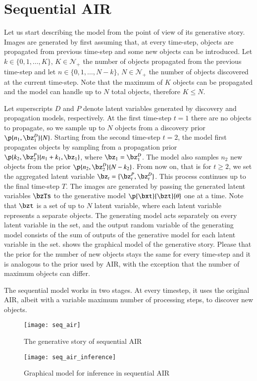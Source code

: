 \section{Sequential AIR}

Let us start describing the model from the point of view of its generative story. Images are generated by first assuming that, at every time-step, objects are propagated from previous time-step and some new objects can be introduced. Let $k \in \{0, 1, \dots, K\}$, $K \in \mathcal{N}_+$ the number of objects propagated from the previous time-step and let $n \in \{0, 1, \dots, N - k\}$, $N \in \mathcal{N}_+$ the number of objects discovered at the current time-step. Note that the maximum of $K$ objects can be propagated and the model can handle up to $N$ total objects, therefore $K \leq N$. 

Let superscripts $D$ and $P$ denote latent variables generated by discovery and propagation models, respectively. At the first time-step $t = 1$ there are no objects to propagate, so we sample up to $N$ objects from a discovery prior $\p{n_1, \bz_1^D}{N}$. Starting from the second time-step $t=2$, the model first propagates objects by sampling from a propagation prior $\p{k_2, \bz_2^P}{n_1 + k_1, \bz_1}$, where $\bz_1 = \bz_1^D$. The model also samples $n_2$ new objects from the prior $\p{n_2, \bz_2^D}{N - k_2}$. From now on, that is for $t \geq 2$, we set the aggregated latent variable $\bz_t = \{\bz_t^P, \bz_t^D\}$. This process continues up to the final time-step $T$. The images are generated by passing the generated latent variables $\bzTs$ to the generative model $\p{\bxt}{\bzt}{\theta}$ one at a time. Note that $\bzt$ is a set of up to $N$ latent variable, where each latent variable represents a separate objects. The generating model acts separately on every latent variable in the set, and the output random variable of the generating model consists of the sum of outputs of the generative model for each latent variable in the set.  shows the graphical model of the generative story. Please that the prior for the number of new objects stays the same for every time-step and it is analogous to the prior used by AIR, with the exception that the number of maximum objects can differ.

 
The sequential model works in two stages. At every timestep, it uses the original AIR, albeit with a variable maximum number of processing steps, to discover new objects. 

\begin{figure}
    \texttt{[image: seq\_air]}
    \caption{The generative story of sequential AIR}
    \label{fig:seq_air}
\end{figure}

\begin{figure}
    \texttt{[image: seq\_air\_inference]}
    \caption{Graphical model for inference in sequential AIR}
    \label{fig:seq_air_inf}
\end{figure}
